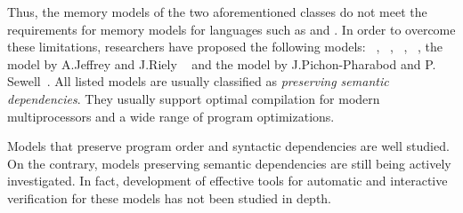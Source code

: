 

Thus, the memory models of the two aforementioned classes do not meet the requirements for memory models for languages such as \CPP and \Java.
In order to overcome these limitations, researchers have proposed the following models:
\Prm~\autocite{Kang-al:POPL17}, \Wkm~\autocite{Chakraborty-Vafeiadis:POPL19},
\MRD~\autocite{Paviotti-al:ESOP20}, \PwP~\autocite{Jagadeesan-al:OOPSLA2020}, the
model by A.Jeffrey and J.Riely ~\autocite{Jeffrey-Riely:LICS16} and the model by J.Pichon-Pharabod and P. Sewell~\autocite{PichonPharabod-Sewell:POPL16}.
All listed models are usually classified as \emph{preserving semantic dependencies}.
They usually support optimal compilation for modern multiprocessors and a wide range of program optimizations.


Models that preserve program order and syntactic dependencies are well studied. On the contrary, models preserving semantic dependencies are still being actively investigated. In fact, development of effective tools for automatic and interactive verification for these models has not been studied in depth.

